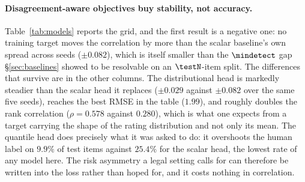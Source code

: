 \documentclass[11pt]{article}
\begin{document}
\begin{table}[t]\centering\small

\caption{Trained metrics, mean over 5 seeds, evaluated on the human-annotated
test split only. \emph{ident.}\ and \emph{unrel.}\ are the two sanity checks in
current use; \textsc{LegalEdit} false-acceptance is the share of legally flipped
pairs still scored $\geq 7$ (``accurate'' under the published rubric). The
margin is the quantity defined in \S\ref{sec:protocol}. It is shown as `--'
where a model places the identical and unrelated probes within one point of
each other, because a model with no working range has none to spend on the
edit.}
\label{tab:models}
\end{table}

\paragraph{Disagreement-aware objectives buy stability, not accuracy.}
Table~\ref{tab:models} reports the grid, and the first result is a negative one:
no training target moves the correlation by more than the scalar baseline's own
spread across seeds ($\pm0.082$), which is itself smaller than the
$\mindetect$ gap \S\ref{sec:baselines} showed to be resolvable on an
$\testN$-item split. The differences that survive are in the other columns. The
distributional head is markedly steadier than the scalar head it replaces
($\pm0.029$ against $\pm0.082$ over the same five seeds), reaches the best RMSE
in the table ($1.99$), and roughly doubles the rank correlation ($\rho=0.578$
against $0.280$), which is what one expects from a target carrying the shape of
the rating distribution and not only its mean. The quantile head does precisely
what it was asked to do: it overshoots the human label on $9.9\%$ of test items
against $25.4\%$ for the scalar head, the lowest rate of any model here. The
risk asymmetry a legal setting calls for can therefore be written into the loss
rather than hoped for, and it costs nothing in correlation.
\end{document}
